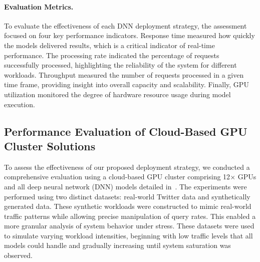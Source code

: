 

\paragraph{Evaluation Metrics.} To evaluate the effectiveness of each DNN deployment strategy, the assessment focused on four key performance indicators. Response time measured how quickly the models delivered results, which is a critical indicator of real-time performance. The processing rate indicated the percentage of requests successfully processed, highlighting the reliability of the system for different workloads. Throughput measured the number of requests processed in a given time frame, providing insight into overall capacity and scalability. Finally, GPU utilization monitored the degree of hardware resource usage during model execution.


\subsection{Performance Evaluation of Cloud-Based GPU Cluster Solutions}

To assess the effectiveness of our proposed deployment strategy, we conducted a comprehensive evaluation using a cloud-based GPU cluster comprising 12$\times$ GPUs and all deep neural network (DNN) models detailed in~. The experiments were performed using two distinct datasets: real-world Twitter data and synthetically generated data. These synthetic workloads were constructed to mimic real-world traffic patterns while allowing precise manipulation of query rates. This enabled a more granular analysis of system behavior under stress. These datasets were used to simulate varying workload intensities, beginning with low traffic levels that all models could handle and gradually increasing until system saturation was observed.

